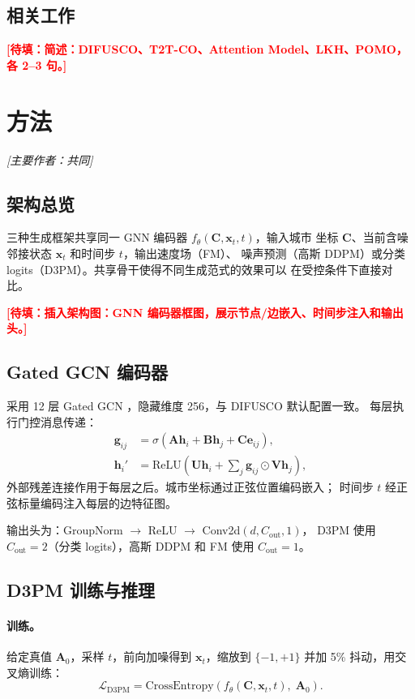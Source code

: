 \documentclass[11pt,a4paper]{article}
\newcommand{\TODO}[1]{\textcolor{red}{\textbf{[待填：#1]}}}
\begin{document}
\subsection{相关工作}
\TODO{简述：DIFUSCO、T2T-CO、Attention Model、LKH、POMO，各 2--3 句。}


\section{方法}
\label{sec:method}
\textit{[主要作者：共同]}

\subsection{架构总览}
三种生成框架共享同一 GNN 编码器 $f_\theta(\mathbf{C}, \mathbf{x}_t, t)$，输入城市
坐标 $\mathbf{C}$、当前含噪邻接状态 $\mathbf{x}_t$ 和时间步 $t$，输出速度场（FM）、
噪声预测（高斯 DDPM）或分类 logits（D3PM）。共享骨干使得不同生成范式的效果可以
在受控条件下直接对比。

\TODO{插入架构图：GNN 编码器框图，展示节点/边嵌入、时间步注入和输出头。}

\subsection{Gated GCN 编码器}
\label{sec:gnn_zh}
采用 12 层 Gated GCN \citep{bresson2017gatedgcn}，隐藏维度 256，与 DIFUSCO 默认配置一致。
每层执行门控消息传递：
\begin{align}
  \mathbf{g}_{ij} &= \sigma\!\left(
    \mathbf{A}\mathbf{h}_i + \mathbf{B}\mathbf{h}_j + \mathbf{C}\mathbf{e}_{ij}
  \right), \\
  \mathbf{h}_i' &= \text{ReLU}\!\left(\mathbf{U}\mathbf{h}_i
    + \textstyle\sum_j \mathbf{g}_{ij} \odot \mathbf{V}\mathbf{h}_j\right),
\end{align}
外部残差连接作用于每层之后。城市坐标通过正弦位置编码嵌入；
时间步 $t$ 经正弦标量编码注入每层的边特征图。

输出头为：GroupNorm $\to$ ReLU $\to$ Conv2d$(d, C_\text{out}, 1)$，
D3PM 使用 $C_\text{out}=2$（分类 logits），高斯 DDPM 和 FM 使用 $C_\text{out}=1$。

\subsection{D3PM 训练与推理}
\paragraph{训练。}
给定真值 $\mathbf{A}_0$，采样 $t$，前向加噪得到 $\mathbf{x}_t$，缩放到 $\{-1,+1\}$
并加 5\% 抖动，用交叉熵训练：
\begin{equation}
  \mathcal{L}_\text{D3PM} = \text{CrossEntropy}\!\left(f_\theta(\mathbf{C},\mathbf{x}_t,t),\;
    \mathbf{A}_0\right).
\end{equation}
\end{document}
